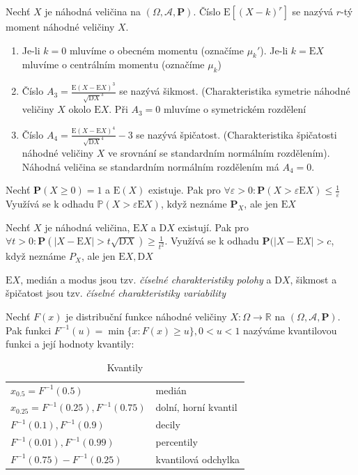 \begin{definition}
Nechť $X$ je náhodná veličina na $(\Omega,\mathcal{A},\textbf{P})$. Číslo $\mathrm{E}[(X-k)^r]$ se nazývá $r$-tý moment náhodné veličiny $X$.
\end{definition}
\begin{enumerate}
\item Je-li $k=0$ mluvíme o obecném momentu (označíme $\mu_k'$). Je-li $k=\mathrm{E}X$ mluvíme o centrálním momentu (označíme $\mu_k$)
\item Číslo $A_3=\frac{\mathrm{E}(X-\mathrm{E}X)^3}{\sqrt{\mathrm{D}X}^3}$ se nazývá šikmost. (Charakteristika symetrie náhodné veličiny $X$ okolo $\mathrm{E}X$. Při $A_3=0$ mluvíme o symetrickém rozdělení
\item Číslo $A_4=\frac{\mathrm{E}(X-\mathrm{E}X)^4}{\sqrt{\mathrm{D}X}^4}-3$ se nazývá špičatost. (Charakteristika špičatosti náhodné veličiny $X$ ve srovnání se standardním normálním rozdělením). Náhodná veličina se standardním normálním rozdělením má $A_4=0$.
\end{enumerate}

\begin{theorem} Nechť $\textbf{P}(X \geq 0) = 1$   a $\mathrm{E}(X)$ existuje. Pak pro $\forall \varepsilon > 0: \textbf{P}(X>\varepsilon\mathrm{E}X) \leq \frac{1}{\varepsilon}$
Využívá se k odhadu $\mathbb{P}(X>\varepsilon\mathrm{E}X)$, když neznáme $\textbf{P}_X$, ale jen $\mathrm{E}X$
\end{theorem}

\begin{theorem} Nechť $X$ je náhodná veličina, $\mathrm{E}X$ a $\mathrm{D}X$ existují. Pak pro $\forall t > 0 : \textbf{P}(|X-\mathrm{E}X|>t\sqrt{\mathrm{D}X})\geq \frac{1}{t^2}$.
Využívá se k odhadu $\textbf{P}(|X-\mathrm{E}X|>c$, když neznáme $P_X$, ale jen $\mathrm{E}X, \mathrm{D}X$ 
\end{theorem}


\begin{notes}
$\mathrm{E}X$, medián a modus jsou tzv. \textit{číselné charakteristiky polohy} a $\mathrm{D}X$, šikmost a špičatost jsou tzv. \textit{číselné charakteristiky variability}
\end{notes}


\begin{theorem}
Nechť $F(x)$ je distribuční funkce náhodné veličiny $X: \Omega \rightarrow \mathbb{R}$ na  $(\Omega,\mathcal{A},\textbf{P})$. Pak funkci $F^{-1}(u)= \min \{x:F(x)\geq u\}, 0 <u<1$ nazýváme kvantilovou funkci a její hodnoty kvantily:
\begin{table}[h]
\centering
\caption{Kvantily}
\begin{tabular}{ll}
$x_{0.5}=F^{-1}(0.5)$ & medián  \\
$x_{0.25}=F^{-1}(0.25),F^{-1}(0.75)$ & dolní, horní kvantil  \\
$F^{-1}(0.1),F^{-1}(0.9)$ & decily  \\
$F^{-1}(0.01),F^{-1}(0.99)$ & percentily  \\
$F^{-1}(0.75)-F^{-1}(0.25)$ & kvantilová odchylka
\end{tabular}
\end{table}
\end{theorem}


